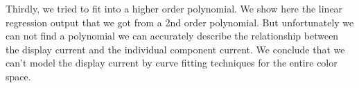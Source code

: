 % 

Thirdly, we tried to fit into a higher order polynomial. We show here the linear
regression output that we got from a 2nd order polynomial. But unfortunately we
can not find a polynomial we can accurately describe the relationship between
the display current and the individual component current.
We conclude that we can't model the display current by curve fitting techniques
for the entire color space.

